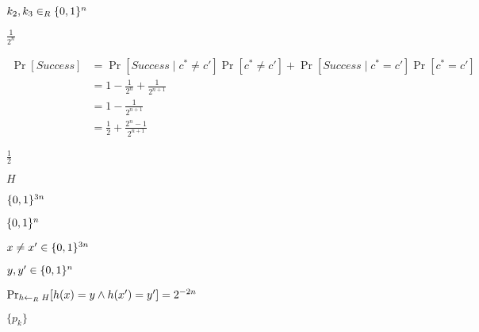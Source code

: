 \documentclass[10pt]{book}
\begin{document}
\begin{mdSnippets}
\begin{mdInlineSnippet}[ad5934992922425f0c879d895195ce24]
$k_2,k_3 \in_R \{0,1\}^n$\end{mdInlineSnippet}%
\begin{mdInlineSnippet}[cc1784df219b5f60fc351c3c720645b1]%
$\frac{1}{2^n}$\end{mdInlineSnippet}%
\begin{mdDisplaySnippet}[a095d84685232358c12a89aac848c776]%
\[%
\begin{aligned}
\Pr[Success] &= \Pr[Success \mid c^* \neq c']\Pr[c^* \neq c'] + \Pr[Success \mid c^* = c']\Pr[c^* = c']  \\
&= 1 - \frac{1}{2^n} + \frac{1}{2^{n+1}} \\
&= 1 - \frac{1}{2^{n+1}} \\
&= \frac{1}{2} + \frac{2^n - 1}{2^{n+1}}
\end{aligned}
\]%
\end{mdDisplaySnippet}%
\begin{mdInlineSnippet}[93b05c90d14a117ba52da1d743a43ab1]%
$\frac{1}{2}$\end{mdInlineSnippet}%
\begin{mdInlineSnippet}[c1d9f50f86825a1a2302ec2449c17196]%
$H$\end{mdInlineSnippet}%
\begin{mdInlineSnippet}[6ba5b9daf1470df4cc0a64e898d406e0]%
$\{0,1\}^{3n}$\end{mdInlineSnippet}%
\begin{mdInlineSnippet}[5867c9b098884eca2779f6d98d4b0b29]%
$\{0,1\}^n$\end{mdInlineSnippet}%
\begin{mdInlineSnippet}%
$x\neq x'\in\{0,1\}^{3n}$\end{mdInlineSnippet}%
\begin{mdInlineSnippet}[202fde142b896c250ab7b35d3d6ad30f]%
$y,y'\in\{0,1\}^n$\end{mdInlineSnippet}%
\begin{mdInlineSnippet}[18a7c7573d945b5aacc7a79ed43c1650]%
$\Pr_{h\leftarrow_R\; H}[ h(x)=y \wedge h(x')=y' ]=2^{-2n}$\end{mdInlineSnippet}%
\begin{mdInlineSnippet}[794d2956e3379682bb8650ba84d7a1ef]%
$\{ p_k \}$\end{mdInlineSnippet}%

\end{mdSnippets}
\end{document}
